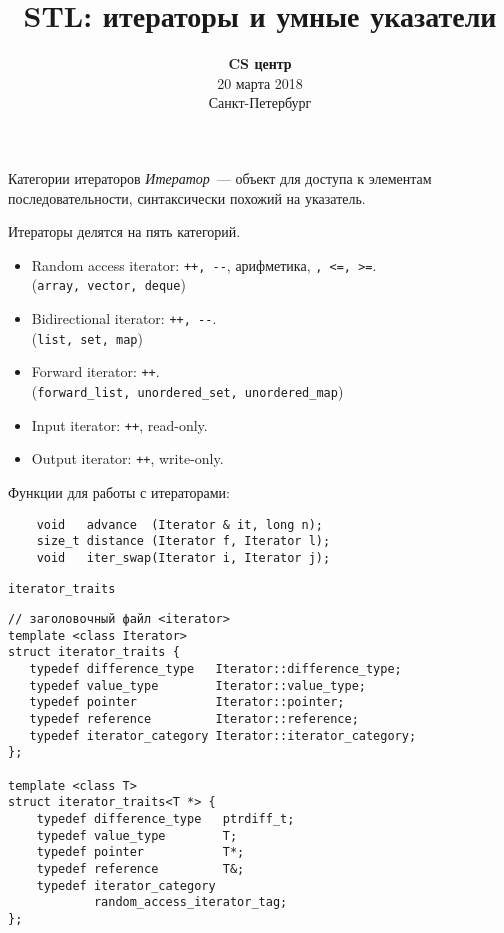 \documentclass{beamer}
\title{STL: итераторы и умные указатели}
\date{
   \textbf{CS центр}\\
   20 марта 2018 \\
   Санкт-Петербург
}
\begin{document}
\begin{frame} 
  \titlepage
\end{frame}

\begin{frame}[fragile]{Категории итераторов}
\small
    \emph{Итератор}~— объект для доступа к элементам
    последовательности, синтаксически похожий на указатель.

    Итераторы делятся на пять категорий. 
    \begin{itemize}
        \item Random access iterator: {\tt ++, \verb!--!}, арифметика, {\tt <, >, <=, >=}.\\
        (\texttt{array, vector, deque})

        \item Bidirectional iterator: {\tt ++, \verb!--!}.\\
        (\texttt{list, set, map})

        \item Forward iterator: {\tt ++}.\\
        (\texttt{forward\_list, unordered\_set, unordered\_map})

        \item Input iterator: {\tt ++}, read-only.

        \item Output iterator: {\tt ++}, write-only.
    \end{itemize}

    Функции для работы с итераторами:
\begin{lstlisting}
    void   advance  (Iterator & it, long n);
    size_t distance (Iterator f, Iterator l);
    void   iter_swap(Iterator i, Iterator j);
\end{lstlisting}
\end{frame}

\begin{frame}[fragile]{{\tt iterator\_traits}}
\begin{lstlisting}
// заголовочный файл <iterator>
template <class Iterator>
struct iterator_traits {
   typedef difference_type   Iterator::difference_type;
   typedef value_type        Iterator::value_type;
   typedef pointer           Iterator::pointer;
   typedef reference         Iterator::reference;
   typedef iterator_category Iterator::iterator_category;
};

template <class T>
struct iterator_traits<T *> {
    typedef difference_type   ptrdiff_t;
    typedef value_type        T;
    typedef pointer           T*;
    typedef reference         T&;
    typedef iterator_category 
            random_access_iterator_tag;
};
\end{lstlisting}
\end{frame}
 
\end{document}
